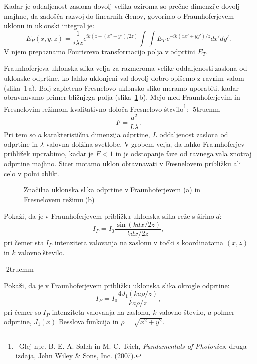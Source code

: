 Kadar je oddaljenost zaslona dovolj velika oziroma so 
prečne dimenzije dovolj majhne, da zadošča 
razvoj do linearnih členov, govorimo o Fraunhoferjevem uklonu in uklonski integral je:
\begin{equation}
\label{eq:FraunhoferApprox}
E_P(x,y,z) =  \frac{1}{i\lambda z} e^{i k (z + (x^2+y^2) /2z)}\int \int E_T\,
e^{-ik (xx'+yy')/z} dx' dy'.
\end{equation}
V njem  prepoznamo Fourierevo transformacijo polja v odprtini $E_T$.

Fraunhoferjeva uklonska slika velja za razmeroma velike oddaljenosti
zaslona od uklonske odprtine, ko lahko uklonjeni val dovolj dobro opišemo z ravnim valom
(slika~\ref{fig:UklonFF}\,a). 
Bolj zapleteno Fresnelovo uklonsko sliko moramo uporabiti, kadar obravnavamo 
primer bližnjega polja (slika~\ref{fig:UklonFF}\,b). 
Mejo med Fraunhoferjevim in Fresnelovim režimom kvalitativno določa Fresnelovo
število\footnote{~Glej npr. B. E. A. Saleh in M. C. Teich, 
{\it Fundamentals of Photonics}, druga izdaja, John Wiley \& Sons, Inc. (2007).}:
\vglue-5truemm
\begin{equation}
F= \frac{a^2}{L\lambda}.
\label{eq:Fst}
\end{equation} 
Pri tem so $a$ karakteristična dimenzija odprtine, $L$ oddaljenost zaslona 
od odprtine in $\lambda$ valovna dolžina svetlobe. V grobem velja, da lahko 
Fraunhoferjev približek uporabimo, kadar je $F<1$ in je odstopanje faze od ravnega vala 
znotraj odprtine majhno. Sicer moramo uklon obravnavati v Fresnelovem približku ali 
celo v polni obliki. 

\begin{figure}[ht]
 \centering {} 
  
\caption{Značilna uklonska slika odprtine v Fraunhoferjevem (a) in Fresnelovem režimu (b)}
\label{fig:UklonFF}
\end{figure}
\begin{naloga}
\label{naloga-Frauhofer-Kirchhoff-uklon_reza}
Pokaži, da je v Fraunhoferjevem približku uklonska slika reže s širino $d$:
\begin{equation}
I_P = I_0\frac{\sin(k d x / 2z)}{k d x/2z},
\end{equation}
pri čemer sta $I_P$ intenziteta valovanja na zaslonu v točki s 
koordinatama $(x,z)$ in $k$ valovno število.
\end{naloga}
\vglue-2truemm
\begin{naloga}
\label{naloga-Frauhofer-Kirchhoff-uklon}
Pokaži, da je v Fraunhoferjevem približku uklonska slika okrogle odprtine:
\begin{equation}
I_P = I_0\frac{4 J_1(k a \rho/ z)}{k a \rho/z},
\end{equation}
pri čemer so $I_P$ intenziteta valovanja na zaslonu, 
$k$ valovno število, $a$ polmer odprtine, 
$J_1(x)$ Besslova funkcija in $\rho = \sqrt{x^2+y^2}$.
\end{naloga}

